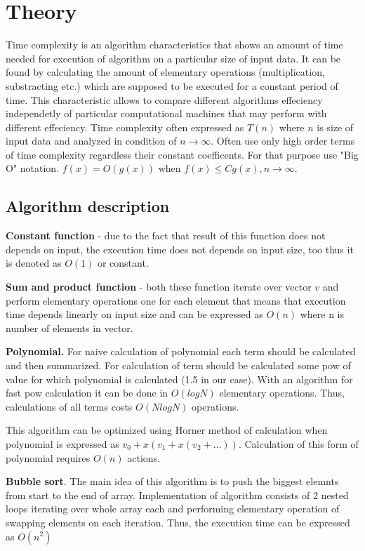\section*{Theory}

Time complexity is an algorithm characteristics that shows an amount of time needed for execution of algorithm
on a particular size of input data. It can be found by calculating the amount of elementary operations (multiplication, substracting etc.) which are supposed to
be executed for a constant period of time. This characteristic allows to compare different algorithms effeciency independetly of particular
computational machines that may perform with different effeciency. Time complexity often expressed as $T(n)$ where $n$ is size of input data and 
analyzed in condition of $n \rightarrow \infty$. Often use only high order terms of time complexity regardless their constant coefficents.
For that purpose use "Big O" notation. $f(x) = O(g(x))$ when $f(x) \leq C g(x), n \rightarrow \infty$.

\subsection*{Algorithm description}

\textbf{Constant function} - due to the fact that result of this function does not depends on input, the execution time does not depends on 
input size, too thus it is denoted as $O(1)$ or constant.

\textbf{Sum and product function} - both these function iterate over vector $v$ and perform elementary operations
one for each element that means that execution time depends linearly on input size and can be expressed as $O(n)$ where n is number of elements in vector.

\textbf{Polynomial.} For naive calculation of polynomial each term should be calculated and then summarized. For calculation of term should be calculated some pow of value for which polynomial is calculated (1.5 in our case).
With an algorithm for fast pow calculation it can be done in $O(logN)$ elementary operations. Thus, calculations of all terms costs $O(NlogN)$ operations. 

This algorithm can be optimized using Horner method of calculation when polynomial is expressed as $v_0 + x(v_1 + x(v_2 + ...))$. Calculation of this form of polynomial requires $O(n)$ actions.

\textbf{Bubble sort}. The main idea of this algorithm is to push the biggest elemnts from start to the end of array.
Implementation of algorithm consists of 2 nested loops iterating over whole array each and performing elementary operation of swapping elements on each iteration.
Thus, the execution time can be expressed as $O(n^2)$

